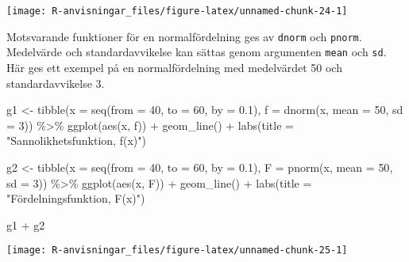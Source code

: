 \documentclass[
]{book}
\newenvironment{Shaded}{\begin{snugshade}}{\end{snugshade}}
\newcommand{\AttributeTok}[1]{\textcolor[rgb]{0.77,0.63,0.00}{#1}}
\newcommand{\DecValTok}[1]{\textcolor[rgb]{0.00,0.00,0.81}{#1}}
\newcommand{\FloatTok}[1]{\textcolor[rgb]{0.00,0.00,0.81}{#1}}
\newcommand{\FunctionTok}[1]{\textcolor[rgb]{0.00,0.00,0.00}{#1}}
\newcommand{\NormalTok}[1]{#1}
\newcommand{\OtherTok}[1]{\textcolor[rgb]{0.56,0.35,0.01}{#1}}
\newcommand{\SpecialCharTok}[1]{\textcolor[rgb]{0.00,0.00,0.00}{#1}}
\newcommand{\StringTok}[1]{\textcolor[rgb]{0.31,0.60,0.02}{#1}}
\theoremstyle{definition}
\theoremstyle{definition}
\theoremstyle{definition}
\theoremstyle{definition}
\theoremstyle{remark}
\begin{document}
\begin{center}\texttt{[image: R-anvisningar\_files/figure-latex/unnamed-chunk-24-1]} \end{center}

Motsvarande funktioner för en normalfördelning ges av \texttt{dnorm} och \texttt{pnorm}. Medelvärde och standardavvikelse kan sättas genom argumenten \texttt{mean} och \texttt{sd}. Här ges ett exempel på en normalfördelning med medelvärdet 50 och standardavvikelse 3.

\begin{Shaded}
\begin{Highlighting}[]
\NormalTok{g1 }\OtherTok{\textless{}{-}} \FunctionTok{tibble}\NormalTok{(}\AttributeTok{x =} \FunctionTok{seq}\NormalTok{(}\AttributeTok{from =} \DecValTok{40}\NormalTok{, }\AttributeTok{to =} \DecValTok{60}\NormalTok{, }\AttributeTok{by =} \FloatTok{0.1}\NormalTok{),}
             \AttributeTok{f =} \FunctionTok{dnorm}\NormalTok{(x, }\AttributeTok{mean =} \DecValTok{50}\NormalTok{, }\AttributeTok{sd =} \DecValTok{3}\NormalTok{)) }\SpecialCharTok{\%\textgreater{}\%} 
  \FunctionTok{ggplot}\NormalTok{(}\FunctionTok{aes}\NormalTok{(x, f)) }\SpecialCharTok{+} 
  \FunctionTok{geom\_line}\NormalTok{() }\SpecialCharTok{+}
  \FunctionTok{labs}\NormalTok{(}\AttributeTok{title =} \StringTok{"Sannolikhetsfunktion, f(x)"}\NormalTok{)}

\NormalTok{g2 }\OtherTok{\textless{}{-}} \FunctionTok{tibble}\NormalTok{(}\AttributeTok{x =} \FunctionTok{seq}\NormalTok{(}\AttributeTok{from =} \DecValTok{40}\NormalTok{, }\AttributeTok{to =} \DecValTok{60}\NormalTok{, }\AttributeTok{by =} \FloatTok{0.1}\NormalTok{),}
             \AttributeTok{F =} \FunctionTok{pnorm}\NormalTok{(x, }\AttributeTok{mean =} \DecValTok{50}\NormalTok{, }\AttributeTok{sd =} \DecValTok{3}\NormalTok{)) }\SpecialCharTok{\%\textgreater{}\%} 
  \FunctionTok{ggplot}\NormalTok{(}\FunctionTok{aes}\NormalTok{(x, F)) }\SpecialCharTok{+} 
  \FunctionTok{geom\_line}\NormalTok{() }\SpecialCharTok{+}
  \FunctionTok{labs}\NormalTok{(}\AttributeTok{title =} \StringTok{"Fördelningsfunktion, F(x)"}\NormalTok{)}

\NormalTok{g1 }\SpecialCharTok{+}\NormalTok{ g2}
\end{Highlighting}
\end{Shaded}

\begin{center}\texttt{[image: R-anvisningar\_files/figure-latex/unnamed-chunk-25-1]} \end{center}
\end{document}
